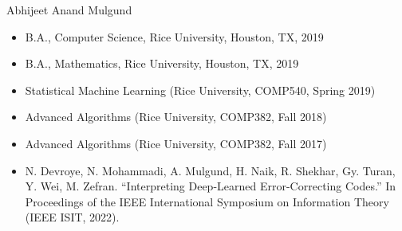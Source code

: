 \vita
\begin{singlespace}
    \begin{description}[labelwidth=4cm,leftmargin=4.2cm,itemsep=1em]

        \item[NAME] Abhijeet Anand Mulgund

        \item[EDUCATION] 
            \begin{itemize}[label={},listparindent=0pt,itemindent=0pt,leftmargin=0pt,itemsep=1em,parsep=0pt,topsep=0pt,partopsep=0pt]
                \item B.A., Computer Science, Rice University, Houston, TX, 2019
                \item B.A., Mathematics, Rice University, Houston, TX, 2019
            \end{itemize}

        \item[TEACHING] 
            \begin{itemize}[label={},listparindent=0pt,itemindent=0pt,leftmargin=0pt,itemsep=1em,parsep=0pt,topsep=0pt,partopsep=0pt]
                \item Statistical Machine Learning (Rice University, COMP540, Spring 2019)
                \item Advanced Algorithms (Rice University, COMP382, Fall 2018)
                \item Advanced Algorithms (Rice University, COMP382, Fall 2017)
            \end{itemize}

        \item[PUBLICATIONS]
            \begin{itemize}[label={},listparindent=0pt,itemindent=0pt,leftmargin=0pt,itemsep=1em,parsep=0pt,topsep=0pt,partopsep=0pt]

                \item N. Devroye, N. Mohammadi, A. Mulgund, H. Naik, R. Shekhar, Gy. Turan, Y. Wei, M. Zefran. %
                ``Interpreting Deep-Learned Error-Correcting Codes.'' %
                In Proceedings of the IEEE International Symposium on Information Theory (IEEE ISIT, 2022).

            \end{itemize}
    \end{description}
\end{singlespace}
